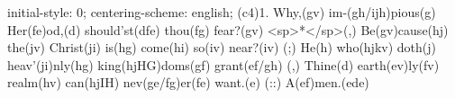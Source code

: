 initial-style: 0;
centering-scheme: english;
(c4)1. Why,(gv) im-(gh/ijh)pious(g) Her(fe)od,(d) should'st(dfe) thou(fg) fear?(gv) <sp>*</sp>(,)
Be(gv)cause(hj) the(jv) Christ(ji) is(hg) come(hi) so(iv) near?(iv) (;)
He(h) who(hjkv) doth(j) heav'(ji)nly(hg) king(hjHG)doms(gf) grant(ef/gh) (,)
Thine(d) earth(ev)ly(fv) realm(hv) can(hjIH) nev(ge/fg)er(fe) want.(e) (::)
A(ef)men.(ede)

